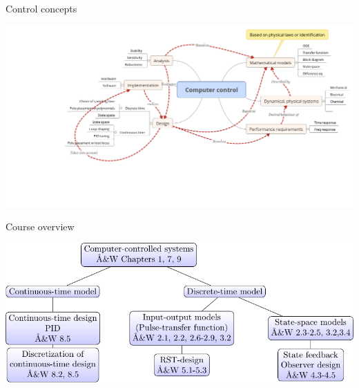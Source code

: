 \documentclass[presentation,aspectratio=169]{beamer}
\begin{document}
\begin{frame}[label=sec-4-1]{Control concepts}
\begin{center}
\includegraphics[width=1.1\linewidth]{../figures/computercontrol.png}
\end{center}
\end{frame}
\begin{frame}[label=sec-4-2]{Course overview}
\begin{center}
\includegraphics[width=\linewidth]{../figures/computer-control-approaches}
\end{center}
\end{frame}
\end{document}
